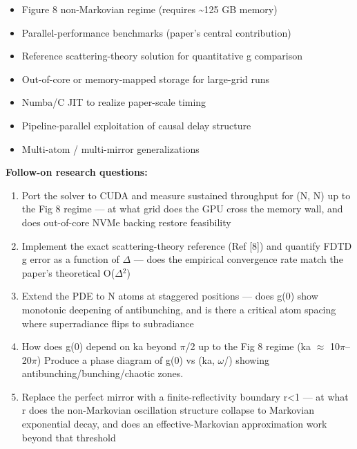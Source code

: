\begin{itemize}[leftmargin=1.4em,itemsep=0.2em,topsep=0.2em]
\item Figure 8 non-Markovian regime (requires \textasciitilde{}125 GB memory)
\item Parallel-performance benchmarks (paper's central contribution)
\item Reference scattering-theory solution for quantitative g comparison
\item Out-of-core or memory-mapped storage for large-grid runs
\item Numba/C JIT to realize paper-scale timing
\item Pipeline-parallel exploitation of causal delay structure
\item Multi-atom / multi-mirror generalizations
\end{itemize}\noindent\textbf{Follow-on research questions:}
\begin{enumerate}[leftmargin=1.6em,itemsep=0.2em,topsep=0.2em,label=Q\arabic*.]
\item Port the solver to CUDA and measure sustained throughput for (N, N) up to the Fig 8 regime --- at what grid does the GPU cross the memory wall, and does out-of-core NVMe backing restore feasibility
\item Implement the exact scattering-theory reference (Ref [8]) and quantify FDTD g error as a function of $\Delta$ --- does the empirical convergence rate match the paper's theoretical O($\Delta$$^2$)
\item Extend the PDE to N atoms at staggered positions --- does g(0) show monotonic deepening of antibunching, and is there a critical atom spacing where superradiance flips to subradiance
\item How does g(0) depend on ka beyond $\pi$/2 up to the Fig 8 regime (ka $\approx$ 10$\pi$--20$\pi$) Produce a phase diagram of g(0) vs (ka, $\omega$/) showing antibunching/bunching/chaotic zones.
\item Replace the perfect mirror with a finite-reflectivity boundary r\textless{}1 --- at what r does the non-Markovian oscillation structure collapse to Markovian exponential decay, and does an effective-Markovian approximation work beyond that threshold
\end{enumerate}

